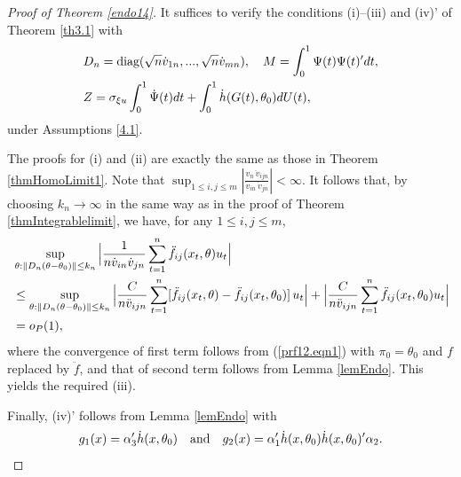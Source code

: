 \begin{proof}[Proof of Theorem \ref {endo14}]
It suffices to verify the conditions (i)--(iii) and (iv)' of Theorem \ref {th3.1} with
\begin{align}
&D_n=\mbox{diag} (\sqrt n\dot{v}_{1n}, ...,\sqrt n\dot{v}_{mn}),  \quad M = \int_{0}^{1}\Psi(t) \Psi(t)' dt, \nonumber\\
& Z = \sigma_{\xi u} \int_{0}^{1} \dot{\Psi}(t)dt +    \int_{0}^{1} \dot{h}(G(t), \theta_0) dU(t),
\end{align}
under Assumptions \ref {4.1}.

The proofs for (i) and (ii)  are exactly the same as those in Theorem \ref{thmHomoLimit1}. Note that $\sup_{1 \le i, j \le m} | \frac{v_n\, \ddot v_{ijn}}{\dot v_{in}\,  \dot v_{jn}}|<\infty$. It follows that, by choosing $k_n \to \infty$ in the same way as in the proof of Theorem \ref{thmIntegrablelimit}, we have, for any $1 \le i,j \le m$,
\begin{align}
 &\sup_{\theta:\parallel D_n(\theta-\theta_0)\parallel\le k_n} \Big |\frac{1}{n \dot{v}_{in} \dot{v}_{jn}}  \sum_{t = 1}^n \ddot{f}_{ij}(x_t, \theta) u_t \Big | \nonumber\\
 &\le \sup_{\theta:\parallel D_n(\theta-\theta_0)\parallel\le k_n}\Big | \frac{C}{n \ddot{v}_{ijn}}  \sum_{t = 1}^n [\ddot{f}_{ij}(x_t, \theta) - \ddot{f}_{ij}(x_t, \theta_0)]\, u_t \Big |  + \Big | \frac{C}{n \ddot{v}_{ijn}}  \sum_{t = 1}^n  \ddot{f}_{ij}(x_t, \theta_0) u_t\Big | \nonumber\\
&= o_P(1),\nonumber
\end{align}
where the convergence of first term follows from (\ref{prf12.eqn1}) with $\pi_0 = \theta_0$ and $f$ replaced by $\ddot{f}$, and that of second term follows from Lemma \ref{lemEndo}. This yields the required (iii).

Finally, (iv)' follows from Lemma \ref{lemEndo} with
\begin{equation*}
g_1(x)=\alpha_3'\dot{h}(x, \theta_0) \quad \mbox{and} \quad g_2(x)=\alpha_1'\dot{h}(x, \theta_0) \dot{h}(x, \theta_0)'\alpha_2.
\end{equation*}
\end{proof}



